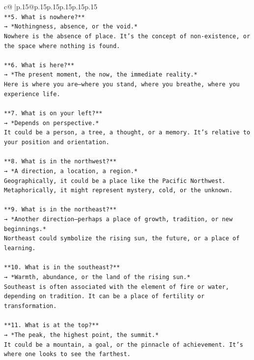 \documentclass{article}
\begin{document}
{\begin{supertabular}{c@{$\;$}|p{.15\linewidth}@{}p{.15\linewidth}p{.15\linewidth}p{.15\linewidth}p{.15\linewidth}p{.15\linewidth}}
{{{\\ 
\texttt{**5. What is nowhere?**  } \\
\texttt{→ *Nothingness, absence, or the void.*  } \\
\texttt{Nowhere is the absence of place. It’s the concept of non{-}existence, or the space where nothing is found.} \\
\\ 
\texttt{**6. What is here?**  } \\
\texttt{→ *The present moment, the now, the immediate reality.*  } \\
\texttt{Here is where you are—where you stand, where you breathe, where you experience life.} \\
\\ 
\texttt{**7. What is on your left?**  } \\
\texttt{→ *Depends on perspective.*  } \\
\texttt{It could be a person, a tree, a thought, or a memory. It’s relative to your position and orientation.} \\
\\ 
\texttt{**8. What is in the northwest?**  } \\
\texttt{→ *A direction, a location, a region.*  } \\
\texttt{Geographically, it could be a place like the Pacific Northwest. Metaphorically, it might represent mystery, cold, or the unknown.} \\
\\ 
\texttt{**9. What is in the northeast?**  } \\
\texttt{→ *Another direction—perhaps a place of growth, tradition, or new beginnings.*  } \\
\texttt{Northeast could symbolize the rising sun, the future, or a place of learning.} \\
\\ 
\texttt{**10. What is in the southeast?**  } \\
\texttt{→ *Warmth, abundance, or the land of the rising sun.*  } \\
\texttt{Southeast is often associated with the element of fire or water, depending on tradition. It can be a place of fertility or transformation.} \\
\\ 
\texttt{**11. What is at the top?**  } \\
\texttt{→ *The peak, the highest point, the summit.*  } \\
\texttt{It could be a mountain, a goal, or the pinnacle of achievement. It’s where one looks to see the farthest.} \\
}}}
\end{supertabular}}
\end{document}
